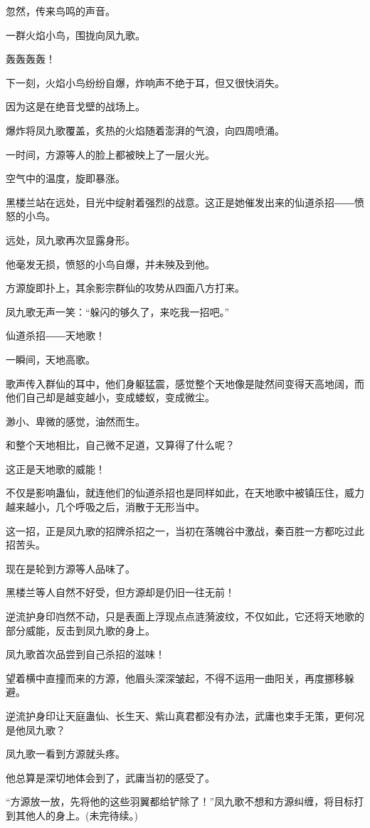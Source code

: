 \begin{this_body}
忽然，传来鸟鸣的声音。

一群火焰小鸟，围拢向凤九歌。

轰轰轰轰！

下一刻，火焰小鸟纷纷自爆，炸响声不绝于耳，但又很快消失。

因为这是在绝音戈壁的战场上。

爆炸将凤九歌覆盖，炙热的火焰随着澎湃的气浪，向四周喷涌。

一时间，方源等人的脸上都被映上了一层火光。

空气中的温度，旋即暴涨。

黑楼兰站在远处，目光中绽射着强烈的战意。这正是她催发出来的仙道杀招――愤怒的小鸟。

远处，凤九歌再次显露身形。

他毫发无损，愤怒的小鸟自爆，并未殃及到他。

方源旋即扑上，其余影宗群仙的攻势从四面八方打来。

凤九歌无声一笑：“躲闪的够久了，来吃我一招吧。”

仙道杀招――天地歌！

一瞬间，天地高歌。

歌声传入群仙的耳中，他们身躯猛震，感觉整个天地像是陡然间变得天高地阔，而他们自己却是越变越小，变成蝼蚁，变成微尘。

渺小、卑微的感觉，油然而生。

和整个天地相比，自己微不足道，又算得了什么呢？

这正是天地歌的威能！

不仅是影响蛊仙，就连他们的仙道杀招也是同样如此，在天地歌中被镇压住，威力越来越小，几个呼吸之后，消散于无形当中。

这一招，正是凤九歌的招牌杀招之一，当初在落魄谷中激战，秦百胜一方都吃过此招苦头。

现在是轮到方源等人品味了。

黑楼兰等人自然不好受，但方源却是仍旧一往无前！

逆流护身印岿然不动，只是表面上浮现点点涟漪波纹，不仅如此，它还将天地歌的部分威能，反击到凤九歌的身上。

凤九歌首次品尝到自己杀招的滋味！

望着横中直撞而来的方源，他眉头深深皱起，不得不运用一曲阳关，再度挪移躲避。

逆流护身印让天庭蛊仙、长生天、紫山真君都没有办法，武庸也束手无策，更何况是他凤九歌？

凤九歌一看到方源就头疼。

他总算是深切地体会到了，武庸当初的感受了。

“方源放一放，先将他的这些羽翼都给铲除了！”凤九歌不想和方源纠缠，将目标打到其他人的身上。(未完待续。)

\end{this_body}

